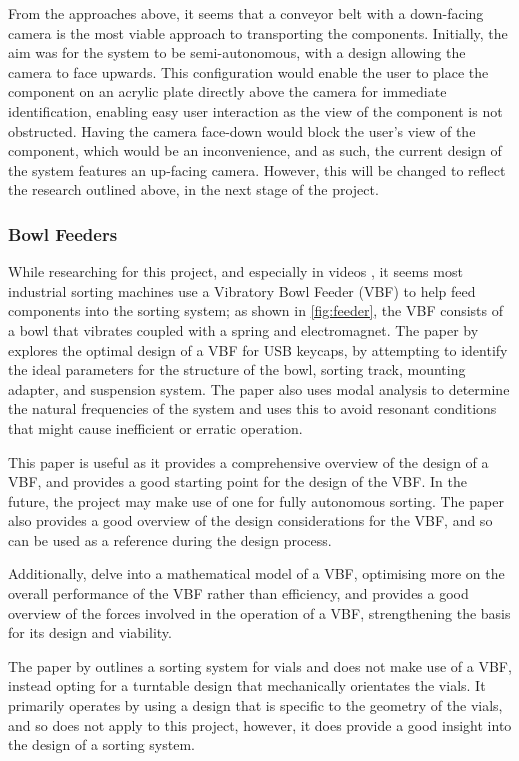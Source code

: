 From the approaches above, it seems that a conveyor belt with a down-facing camera is the most viable approach to transporting the components. Initially, the aim was for the system to be semi-autonomous, with a design allowing the camera to face upwards.
This configuration would enable the user to place the component on an acrylic plate directly above the camera for immediate identification, enabling easy user interaction as the view of the component is not obstructed. 
Having the camera face-down would block the user's view of the component, which would be an inconvenience, and as such, the current design of the system features an up-facing camera. However, 
this will be changed to reflect the research outlined above, in the next stage of the project.

\subsubsection{Bowl Feeders}
While researching for this project, and especially in videos \cite{videobowlfeeder}, it seems most industrial sorting machines use a Vibratory Bowl Feeder (VBF) to help feed components into the sorting system;
as shown in \autoref{fig:feeder}, the VBF consists of a bowl that vibrates coupled with a spring and electromagnet.
The paper by \citet{nam2019design} explores the optimal design of a VBF for USB keycaps, by attempting to identify the ideal parameters for the structure of the bowl,
sorting track, mounting adapter, and suspension system. The paper also uses modal analysis to determine the natural frequencies of the system and uses this to
avoid resonant conditions that might cause inefficient or erratic operation.

This paper is useful as it provides a comprehensive overview of the design of a VBF, and provides a good starting point for the design of the VBF. In the future,
the project may make use of one for fully autonomous sorting. The paper also provides a good overview of the design considerations for the VBF, and so can be used as a reference
during the design process.

Additionally, \citet{REINHART2010191} delve into a mathematical model of a VBF, optimising more on the overall performance of the VBF rather than efficiency, and \citet{ForceAnalysisofVibratoryBowlFeeder}
provides a good overview of the forces involved in the operation of a VBF, strengthening the basis for its design and viability.

The paper by \citet{zhang2019design} outlines a sorting system for vials and does not make use of a VBF, instead opting for a turntable design that mechanically orientates the vials. It primarily operates
by using a design that is specific to the geometry of the vials, and so does not apply to this project, however, it does provide a good insight into the design of a sorting system.

